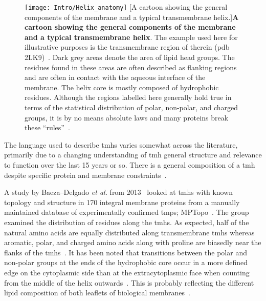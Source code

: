 \begin{figure}[ht]
\centering
\texttt{[image: Intro/Helix\_anatomy]}
		[A cartoon showing the general components of the membrane and a typical transmembrane helix.]{\textbf{A cartoon showing the general components of the membrane and a typical transmembrane helix}.
		The example used here for illustrative purposes is the transmembrane region of therein (\gls{pdb} 2LK9)~\cite{Skasko2012}.
		Dark grey areas denote the area of lipid head groups.
		The residues found in these areas are often described as flanking regions and are often in contact with the aqueous interface of the membrane.
		The helix core is mostly composed of hydrophobic residues.
		Although the regions labelled here generally hold true in terms of the statistical distribution of polar, non-polar, and charged groups, it is by no means absolute laws and many proteins break these ``rules''~\cite{Sharpe2010, Baeza-Delgado2013, Pogozheva2013}.}

\label{fig:helixcartoon1}
\end{figure}


The language used to describe \gls{tmh}s varies somewhat across the literature, primarily due to a changing understanding of \gls{tmh} general structure and relevance to function over the last 15 years or so.
There is a general composition of a \gls{tmh} despite specific protein and membrane constraints~\cite{Sharpe2010}.

A study by Baeza\---Delgado \textit{ et al.} from 2013~\cite{Baeza-Delgado2013} looked at \gls{tmh}s with known topology and structure in 170 integral membrane proteins from a manually maintained database of experimentally confirmed \gls{tmp}s; MPTopo~\cite{Jayasinghe2001}.
The group examined the distribution of residues along the \gls{tmh}s.
As expected, half of the natural amino acids are equally distributed along transmembrane \gls{tmh}s whereas aromatic, polar, and charged amino acids along with proline are biasedly near the flanks of the \gls{tmh}s~\cite{Baeza-Delgado2013}.
It has been noted that transitions between the polar and non-polar groups at the ends of the hydrophobic core occur in a more defined edge on the cytoplasmic side than at the extracytoplasmic face when counting from the middle of the helix outwards~\cite{Baeza-Delgado2013}.
This is probably reflecting the different lipid composition of both leaflets of biological membranes~\cite{Baeza-Delgado2013}.


